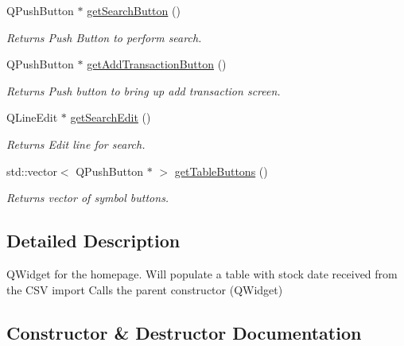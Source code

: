 \begin{DoxyCompactItemize}
\mbox{\label{class_homepage_a59cc8028d2df743675cd66cdd7104fd3}} 
Q\+Push\+Button $\ast$ \mbox{\hyperlink{class_homepage_a59cc8028d2df743675cd66cdd7104fd3}{get\+Search\+Button}} ()
\begin{DoxyCompactList}\small\item\em Returns Push Button to perform search. \end{DoxyCompactList}\item 
\mbox{\label{class_homepage_a952d5e2adcae33b4b1e470b270c17a6f}} 
Q\+Push\+Button $\ast$ \mbox{\hyperlink{class_homepage_a952d5e2adcae33b4b1e470b270c17a6f}{get\+Add\+Transaction\+Button}} ()
\begin{DoxyCompactList}\small\item\em Returns Push button to bring up add transaction screen. \end{DoxyCompactList}\item 
\mbox{\label{class_homepage_a4cbb4d27b50063abbfe6fc321744f2fe}} 
Q\+Line\+Edit $\ast$ \mbox{\hyperlink{class_homepage_a4cbb4d27b50063abbfe6fc321744f2fe}{get\+Search\+Edit}} ()
\begin{DoxyCompactList}\small\item\em Returns Edit line for search. \end{DoxyCompactList}\item 
\mbox{\label{class_homepage_a89e57c716c6ab8c676ec89cd637e4d7b}} 
std\+::vector$<$ Q\+Push\+Button $\ast$ $>$ \mbox{\hyperlink{class_homepage_a89e57c716c6ab8c676ec89cd637e4d7b}{get\+Table\+Buttons}} ()
\begin{DoxyCompactList}\small\item\em Returns vector of symbol buttons. \end{DoxyCompactList}\end{DoxyCompactItemize}


\subsection{Detailed Description}
Q\+Widget for the homepage. Will populate a table with stock date received from the C\+SV import Calls the parent constructor (Q\+Widget) 

\subsection{Constructor \& Destructor Documentation}
\mbox{\label{class_homepage_a7fd9acfe5e1e29c3f00118315fabac53}} 
